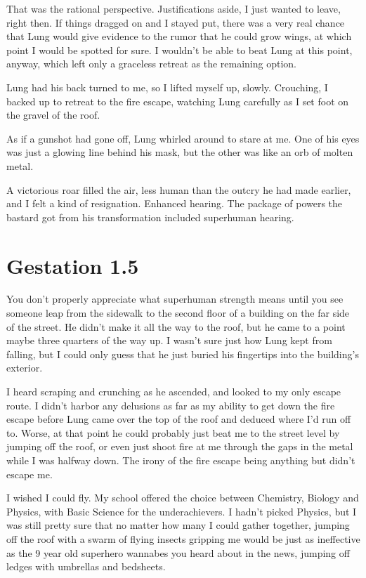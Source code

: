 That was the rational perspective. Justifications aside, I just wanted to leave, right then. If things dragged on and I stayed put, there was a very real chance that Lung would give evidence to the rumor that he could grow wings, at which point I would be spotted for sure. I wouldn't be able to beat Lung at this point, anyway, which left only a graceless retreat as the remaining option.

Lung had his back turned to me, so I lifted myself up, slowly. Crouching, I backed up to retreat to the fire escape, watching Lung carefully as I set foot on the gravel of the roof.

As if a gunshot had gone off, Lung whirled around to stare at me. One of his eyes was just a glowing line behind his mask, but the other was like an orb of molten metal.

A victorious roar filled the air, less human than the outcry he had made earlier, and I felt a kind of resignation. Enhanced hearing. The package of powers the bastard got from his transformation included superhuman hearing.

\chapter{Gestation 1.5}

You don't properly appreciate what superhuman strength means until you see someone leap from the sidewalk to the second floor of a building on the far side of the street. He didn't make it all the way to the roof, but he came to a point maybe three quarters of the way up. I wasn't sure just how Lung kept from falling, but I could only guess that he just buried his fingertips into the building's exterior.

I heard scraping and crunching as he ascended, and looked to my only escape route. I didn't harbor any delusions as far as my ability to get down the fire escape before Lung came over the top of the roof and deduced where I'd run off to. Worse, at that point he could probably just beat me to the street level by jumping off the roof, or even just shoot fire at me through the gaps in the metal while I was halfway down. The irony of the fire escape being anything but didn't escape me.

I wished I could fly. My school offered the choice between Chemistry, Biology and Physics, with Basic Science for the underachievers. I hadn't picked Physics, but I was still pretty sure that no matter how many I could gather together, jumping off the roof with a swarm of flying insects gripping me would be just as ineffective as the 9 year old superhero wannabes you heard about in the news, jumping off ledges with umbrellas and bedsheets.


